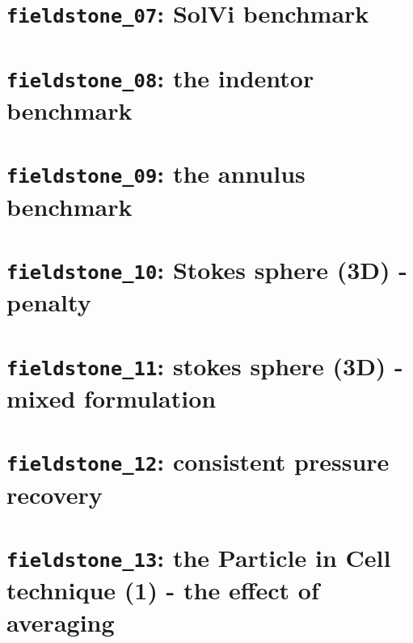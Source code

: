 \documentclass[a4paper]{article}
\begin{document}
\newpage
\section{{\tt fieldstone\_07}: SolVi benchmark \label{f07}}


\newpage
\section{{\tt fieldstone\_08}: the indentor benchmark \label{f08}}


\newpage
\section{{\tt fieldstone\_09}: the annulus benchmark \label{f09}}



\newpage
\section{{\tt fieldstone\_10}: Stokes sphere (3D) - penalty \label{f10}}


\newpage
\section{{\tt fieldstone\_11}: stokes sphere (3D) - mixed formulation \label{f11}}


\newpage
\section{{\tt fieldstone\_12}: consistent pressure recovery \label{f12}}


\newpage
\section{{\tt fieldstone\_13}: the Particle in Cell technique (1) - the effect of averaging \label{f13}}

\end{document}
